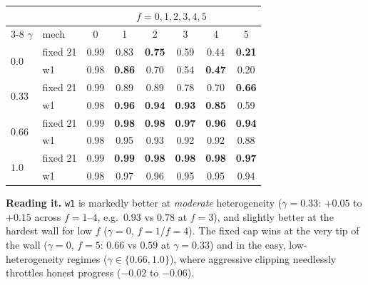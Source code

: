 \documentclass[11pt]{article}
\newcommand{\code}[1]{\texttt{#1}}
\begin{document}
\begin{center}\small
\setlength{\tabcolsep}{5pt}
\begin{tabular}{@{}ll cccccc@{}}
\toprule
& & \multicolumn{6}{c}{$f=0,1,2,3,4,5$}\\ \cmidrule(l){3-8}
$\gamma$ & mech & 0 & 1 & 2 & 3 & 4 & 5\\
\midrule
\multirow{2}{*}{$0.0$}  & fixed 21 & 0.99 & 0.83 & \textbf{0.75} & 0.59 & 0.44 & \textbf{0.21}\\
                        & w1       & 0.98 & \textbf{0.86} & 0.70 & 0.54 & \textbf{0.47} & 0.20\\
\midrule
\multirow{2}{*}{$0.33$} & fixed 21 & 0.99 & 0.89 & 0.89 & 0.78 & 0.70 & \textbf{0.66}\\
                        & w1       & 0.98 & \textbf{0.96} & \textbf{0.94} & \textbf{0.93} & \textbf{0.85} & 0.59\\
\midrule
\multirow{2}{*}{$0.66$} & fixed 21 & 0.99 & \textbf{0.98} & \textbf{0.98} & \textbf{0.97} & \textbf{0.96} & \textbf{0.94}\\
                        & w1       & 0.98 & 0.95 & 0.93 & 0.92 & 0.92 & 0.88\\
\midrule
\multirow{2}{*}{$1.0$}  & fixed 21 & 0.99 & \textbf{0.99} & \textbf{0.98} & \textbf{0.98} & \textbf{0.98} & \textbf{0.97}\\
                        & w1       & 0.98 & 0.97 & 0.96 & 0.95 & 0.95 & 0.94\\
\bottomrule
\end{tabular}
\end{center}

\noindent\textbf{Reading it.} \code{w1} is markedly better at \emph{moderate} heterogeneity
($\gamma{=}0.33$: $+0.05$ to $+0.15$ across $f{=}1$--$4$, e.g.\ $0.93$ vs $0.78$ at $f{=}3$),
and slightly better at the hardest wall for low $f$ ($\gamma{=}0$, $f{=}1$/$f{=}4$). The
fixed cap wins at the very tip of the wall ($\gamma{=}0$, $f{=}5$: $0.66$ vs $0.59$ at
$\gamma{=}0.33$) and in the easy, low-heterogeneity regimes ($\gamma\in\{0.66,1.0\}$), where
aggressive clipping needlessly throttles honest progress ($-0.02$ to $-0.06$).
\end{document}
